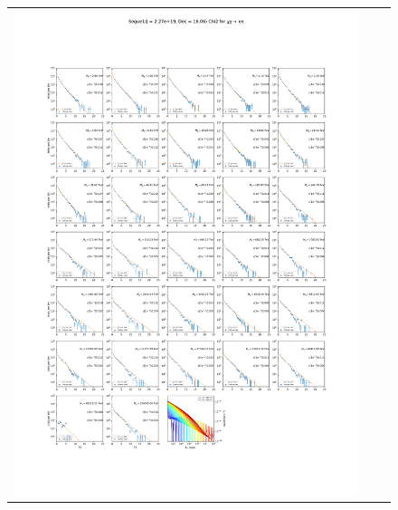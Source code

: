 \begin{figure}[!hb]
{\begin{tabular}{ccc}
            \includegraphics[clip, trim=22.1cm 6.5cm 19.5cm 56.5cm, scale=0.55]{figures/ic_DM/dm_plots/Segue1_ee_chi2_Masspanel_2024-03-23.pdf} &

\end{tabular}}
\end{figure}
